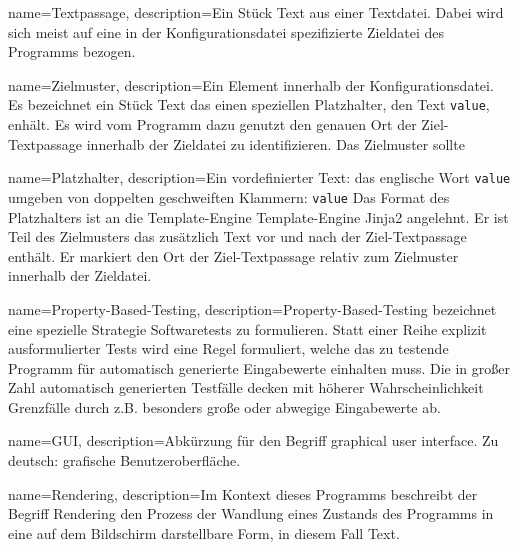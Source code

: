\makeglossaries

{
    name=Textpassage,
    description={Ein Stück Text aus einer Textdatei. Dabei
            wird sich meist auf eine in der Konfigurationsdatei spezifizierte
            Zieldatei des Programms bezogen.}
}

{
    name=Zielmuster,
    description={Ein Element innerhalb der Konfigurationsdatei. Es bezeichnet ein
            Stück Text das einen speziellen \gls{Platzhalter}, den Text \texttt{{{value}}},
            enhält. Es wird vom Programm dazu genutzt den genauen Ort der Ziel-\gls{Textpassage}
            innerhalb der Zieldatei zu identifizieren. Das Zielmuster sollte}
}

{
    name=Platzhalter,
    description={Ein vordefinierter Text: das englische Wort \texttt{value}
            umgeben von doppelten geschweiften Klammern:
            \texttt{{{value}}} Das Format des Platzhalters ist an
            die Template-Engine Template-Engine Jinja2 \cite{jinja2} angelehnt.
            Er ist Teil des \gls{Zielmuster}s das zusätzlich Text vor und nach
            der Ziel-\gls{Textpassage} enthält. Er markiert den Ort der Ziel-\gls{Textpassage}
            relativ zum \gls{Zielmuster} innerhalb der Zieldatei.}
}

{
    name=Property-Based-Testing,
    description={Property-Based-Testing bezeichnet eine spezielle Strategie Softwaretests
            zu formulieren. Statt einer Reihe explizit ausformulierter Tests wird eine Regel
            formuliert, welche das zu testende Programm für automatisch generierte Eingabewerte
            einhalten muss. Die in großer Zahl automatisch generierten Testfälle
            decken mit höherer Wahrscheinlichkeit Grenzfälle durch z.B. besonders
            große oder abwegige Eingabewerte ab.}
}

{
    name=GUI,
    description={Abkürzung für den Begriff graphical user interface. Zu deutsch:
            grafische Benutzeroberfläche.}
}

{
    name=Rendering,
    description={Im Kontext dieses Programms beschreibt der Begriff Rendering den
            Prozess der Wandlung eines Zustands des Programms in eine auf dem Bildschirm
            darstellbare Form, in diesem Fall Text.}
}

\glsaddall